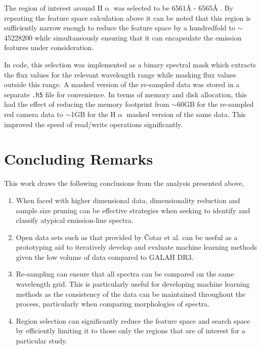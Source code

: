 The region of interest around H$\upalpha$ was selected to be 6561\r{A} - 6565\r{A} \citep{traven2017galah}. By repeating the feature space calculation above it can be noted that this region is sufficiently narrow enough to reduce the feature space by a hundredfold to $\sim$ \num[round-precision=2,round-mode=figures, scientific-notation=true]{45228200} while simultaneously ensuring that it can encapsulate the emission features under consideration. 

In code, this selection was implemented as a binary spectral mask which extracts the flux values for the relevant wavelength range while masking flux values outside this range. A masked version of the re-sampled data was stored in a separate \texttt{.h5} file for convenience. In terms of memory and disk allocation, this had the effect of reducing the memory footprint from $\sim$60GB for the re-sampled red camera data to $\sim$1GB for the H$\upalpha$ masked version of the same data. This improved the speed of read/write operations significantly. 

\section{Concluding Remarks}

This work draws the following conclusions from the analysis presented above,

\begin{enumerate}
\item When faced with higher dimensional data, dimensionality reduction and sample size pruning can be effective strategies when seeking to identify and classify atypical emission-line spectra. 

\item Open data sets such as that provided by Čotar et al. can be useful as a prototyping aid to iteratively develop and evaluate machine learning methods given the low volume of data compared to GALAH DR3. 

\item Re-sampling can ensure that all spectra can be compared on the same wavelength grid. This is particularly useful for developing machine learning methods as the consistency of the data can be maintained throughout the process, particularly when comparing morphologies of spectra.  

\item Region selection can significantly reduce the feature space and search space by efficiently limiting it to those only the regions that are of interest for a particular study. 
\end{enumerate}

